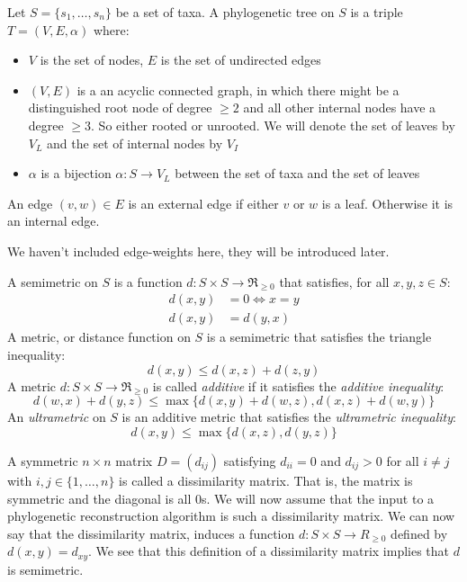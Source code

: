     Let $S=\{s_1,\dots,s_n\}$ be a set of taxa. A phylogenetic tree on $S$ is a 
    triple $T=(V,E,\alpha)$ where:
    \begin{itemize}
        \item $V$ is the set of nodes, $E$ is the set of undirected edges
        \item $(V,E)$ is a an acyclic connected graph, in which there might be 
        a distinguished root node of degree $\geq 2$ and all other internal 
        nodes have a degree $\geq 3$. So either rooted or unrooted. We will 
        denote the set of leaves by $V_L$ and the set of internal nodes by $V_I$
        \item $\alpha$ is a bijection $\alpha: S \rightarrow V_L$ between the 
        set of taxa and the set of leaves
    \end{itemize}
    An edge $(v,w) \in E$ is an external edge if either $v$ or $w$ is a leaf. 
    Otherwise it is an internal edge.
    
    We haven't included edge-weights here, they will be introduced later.
    
    A semimetric on $S$ is a function $d:S\times S\rightarrow \Re_{\geq 0}$ 
    that satisfies, for all $x,y,z \in S$:
    \begin{align*}
        d(x,y) &= 0 \iff x=y\\
        d(x,y) &= d(y,x)
    \end{align*}
    A metric, or distance function on $S$ is a semimetric that satisfies the 
    triangle inequality:
    \begin{equation*}
        d(x,y) \leq d(x,z) + d(z,y)
    \end{equation*}
    A metric $d:S\times S\rightarrow \Re_{\geq 0}$ is called \textit{additive} 
    if it satisfies the \textit{additive inequality}:
    \begin{equation*}
        d(w,x)+d(y,z) \leq \max\{d(x,y)+d(w,z), d(x,z)+d(w,y)\}
    \end{equation*} 
    An \textit{ultrametric} on $S$ is an additive metric that satisfies the 
    \textit{ultrametric inequality}:
    \begin{equation*}
        d(x,y) \leq \max\{d(x,z),d(y,z)\}
    \end{equation*}
    
    A symmetric $n \times n$ matrix $D=(d_{ij})$ satisfying $d_{ii}=0$ and 
    $d_{ij}>0$ for all $i\neq j$ with $i,j \in \{1,\dots,n\}$ is called a 
    dissimilarity matrix. That is, the matrix is symmetric and the diagonal is 
    all $0$s. We will now assume that the input to a phylogenetic 
    reconstruction algorithm is such a dissimilarity matrix. We can now say 
    that the dissimilarity matrix, induces a function $d:S \times S\rightarrow 
    R_{\geq 0}$ defined by $d(x,y)=d_{xy}$. We see that this definition of a 
    dissimilarity matrix implies that $d$ is semimetric.
    
